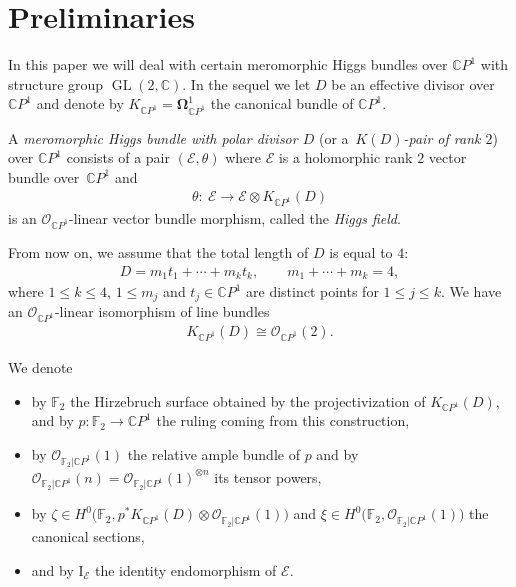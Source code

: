 \documentclass[pdftex]{sigma}
\newcommand{\C}{{\mathbb C}} %
\renewcommand{\O}{{\mathcal O}} %
\newcommand{\CP}[1]{\mathbb{C}P^{#1}} %
\newcommand{\E}{{\mathcal E}} %
\DeclareMathOperator{\Gl}{GL}
\numberwithin{equation}{section}
\begin{document}
\section{Preliminaries}\label{sec:prelims}

In this paper we will deal with certain meromorphic Higgs bundles over $\CP1$ with structure group $\Gl(2,\C)$.
In the sequel we let $D$ be an effective divisor over $\CP1$ and denote by $K_{\CP1} = \mathbf{\Omega}_{\CP1}^1$ the canonical bundle of $\CP1$.

\begin{defn}A {\it meromorphic Higgs bundle with polar divisor $D$} (or a~{\it $K(D)$-pair of rank $2$}) over $\CP1$ consists of a pair $(\E,
\theta)$ where $\E$ is a holomorphic rank $2$ vector bundle over~$\CP1$ and
\begin{gather*}
 \theta\colon \ \E \to \E \otimes K_{\CP1}(D)
\end{gather*}
is an $\O_{\CP1}$-linear vector bundle morphism, called the {\it Higgs field}.
\end{defn}

From now on, we assume that the total length of $D$ is equal to $4$:
\begin{gather}\label{eq:divisor}
 D = m_1 t_1 + \cdots + m_k t_k, \qquad m_1 + \cdots + m_k = 4,
\end{gather}
where $1 \leq k \leq 4$, $1\leq m_j$ and $t_j \in \CP1$ are distinct points for $1 \leq j \leq k$.
We have an $\O_{\CP1}$-linear isomorphism of line bundles
\begin{gather}\label{eq:KDO2}
 K_{\CP1}(D) \cong \O_{\CP1}(2).
\end{gather}

We denote
\begin{itemize}\itemsep=0pt
 \item {by ${\mathbb {F}}_2$ the Hirzebruch surface obtained
 by the projectivization of $K_{\CP1}(D)$, and by $p\colon {\mathbb
 {F}}_2 \to \CP1$ the ruling coming from this construction,}
 \item by $\O_{{\mathbb {F}}_2 | \CP1}(1)$ the relative ample bundle
 of $p$ and by $\O_{{\mathbb {F}}_2 | \CP1}(n) = \O_{{\mathbb {F}}_2
 | \CP1}(1)^{\otimes n}$ its tensor powers,
 \item by $\zeta \in H^0 \big({\mathbb {F}}_2 ,p^* K_{\CP1}(D)
 \otimes \O_{{\mathbb {F}}_2 | \CP1}(1) \big)$ and $\xi \in H^0
 \big({\mathbb {F}}_2 , \O_{{\mathbb {F}}_2 | \CP1}(1) \big)$ the
 canonical sections,
 \item and by $\mbox{I}_{\E}$ the identity endomorphism of $\E$.
\end{itemize}
\end{document}
